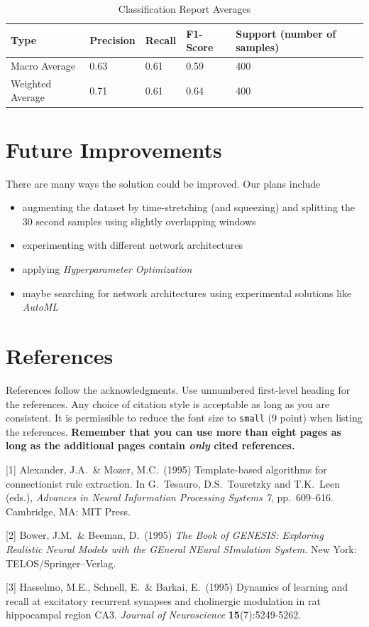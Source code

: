 \documentclass{article}
\begin{document}
\begin{table}[h]
  \caption{Classification Report Averages}
  \centering
  \begin{tabular}{l | l l l l}
    Type & Precision & Recall & F1-Score & Support (number of samples) \\
    \midrule
		Macro Average & 0.63 & 0.61 & 0.59 & 400 \\
		Weighted Average & 0.71 & 0.61 & 0.64 & 400 \\
    \bottomrule
  \end{tabular}
\end{table}

\section{Future Improvements}

There are many ways the solution could be improved. Our plans include

\begin{itemize}
\item augmenting the dataset by time-stretching (and squeezing) and splitting the 30 second 
samples using slightly overlapping windows 
\item experimenting with different network architectures
\item applying \emph{Hyperparameter Optimization}
\item maybe searching for network architectures using experimental solutions like \emph{AutoML}
\end{itemize}


\section*{References}

References follow the acknowledgments. Use unnumbered first-level heading for
the references. Any choice of citation style is acceptable as long as you are
consistent. It is permissible to reduce the font size to \verb+small+ (9 point)
when listing the references. {\bf Remember that you can use more than eight
  pages as long as the additional pages contain \emph{only} cited references.}
\medskip

\small

[1] Alexander, J.A.\ \& Mozer, M.C.\ (1995) Template-based algorithms for
connectionist rule extraction. In G.\ Tesauro, D.S.\ Touretzky and T.K.\ Leen
(eds.), {\it Advances in Neural Information Processing Systems 7},
pp.\ 609--616. Cambridge, MA: MIT Press.

[2] Bower, J.M.\ \& Beeman, D.\ (1995) {\it The Book of GENESIS: Exploring
  Realistic Neural Models with the GEneral NEural SImulation System.}  New York:
TELOS/Springer--Verlag.

[3] Hasselmo, M.E., Schnell, E.\ \& Barkai, E.\ (1995) Dynamics of learning and
recall at excitatory recurrent synapses and cholinergic modulation in rat
hippocampal region CA3. {\it Journal of Neuroscience} {\bf 15}(7):5249-5262.
\end{document}
